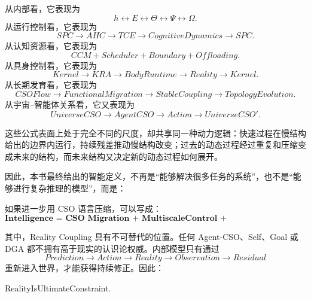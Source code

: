 从内部看，它表现为
\begin{equation}
h
\leftrightarrow
E
\leftrightarrow
\Theta
\leftrightarrow
\Psi
\leftrightarrow
\Omega.
\end{equation}
从运行控制看，它表现为
\begin{equation}
SPC
\rightarrow
AHC
\rightarrow
TCE
\rightarrow
CognitiveDynamics
\rightarrow
SPC.
\end{equation}
从认知资源看，它表现为
\begin{equation}
CCM
+
Scheduler
+
Boundary
+
Offloading.
\end{equation}
从具身控制看，它表现为
\begin{equation}
Kernel
\rightarrow
KRA
\rightarrow
BodyRuntime
\rightarrow
Reality
\rightarrow
Kernel.
\end{equation}
从长期发育看，它表现为
\begin{equation}
CSOFlow
\rightarrow
FunctionalMigration
\rightarrow
StableCoupling
\rightarrow
TopologyEvolution.
\end{equation}
从宇宙--智能体关系看，它又表现为
\begin{equation}
UniverseCSO
\rightarrow
AgentCSO
\rightarrow
Action
\rightarrow
UniverseCSO'.
\end{equation}

这些公式表面上处于完全不同的尺度，却共享同一种动力逻辑：快速过程在慢结构给出的边界内运行，持续残差推动慢结构改变；过去的动态过程经过重复和压缩变成未来的结构，而未来结构又决定新的动态过程如何展开。

因此，本书最终给出的智能定义，不再是“能够解决很多任务的系统”，也不是“能够进行复杂推理的模型”，而是：
\begin{statementbox}
\centering
{}
\end{statementbox}

如果进一步用 CSO 语言压缩，可以写成：
\begin{equation}
\boxed{
\textbf{
Intelligence
=
CSO\ Migration
+
MultiscaleControl
+
TopologyCoevolution
+
RealityCoupling.
}
}
\end{equation}

其中，Reality Coupling 具有不可替代的位置。任何 Agent-CSO、Self、Goal 或 DGA 都不拥有高于现实的认识论权威。内部模型只有通过
\begin{equation}
Prediction
\rightarrow
Action
\rightarrow
Reality
\rightarrow
Observation
\rightarrow
Residual
\end{equation}
重新进入世界，才能获得持续修正。因此：
\begin{statementbox}
RealityIsUltimateConstraint.
\end{statementbox}

